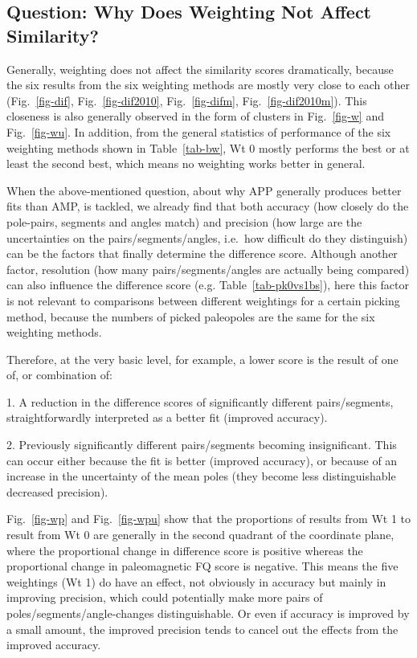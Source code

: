 \subsection{Question: Why Does Weighting Not Affect Similarity?}

Generally, weighting does not affect the similarity scores dramatically, because
the six results from the six weighting methods are mostly very close to each
other (Fig.~\ref{fig-dif}, Fig.~\ref{fig-dif2010}, Fig.~\ref{fig-difm},
Fig.~\ref{fig-dif2010m}). This closeness is also generally observed in the form
of clusters in Fig.~\ref{fig-w} and Fig.~\ref{fig-wu}. In addition, from the
general statistics of performance of the six weighting methods shown in
Table~\ref{tab-bw}, Wt 0 mostly performs the best or at least the second best,
which means no weighting works better in general.

When the above-mentioned question, about why APP generally produces better fits
than AMP, is tackled, we already find that both accuracy (how closely do the
pole-pairs, segments and angles match) and precision (how large are the
uncertainties on the pairs/segments/angles, i.e.\ how difficult do they
distinguish) can be the factors that finally determine the difference score.
Although another factor, resolution (how many pairs/segments/angles are actually
being compared) can also influence the difference score (e.g.
Table~\ref{tab-pk0vs1bs}), here this factor is not relevant to comparisons
between different weightings for a certain picking method, because the numbers
of picked paleopoles are the same for the six weighting methods.

Therefore, at the very basic level, for example, a lower score is the result of
one of, or combination of:

1. A reduction in the difference scores of significantly different
pairs/segments, straightforwardly interpreted as a better fit (improved
accuracy).

2. Previously significantly different pairs/segments becoming insignificant.
This can occur either because the fit is better (improved accuracy), or because
of an increase in the uncertainty of the mean poles (they become less
distinguishable \textemdash{} decreased precision).

Fig.~\ref{fig-wp} and Fig.~\ref{fig-wpu} show that the proportions of results
from Wt 1 to result from Wt 0 are generally in the second quadrant
of the coordinate plane, where the proportional change in difference score is
positive whereas the proportional change in paleomagnetic FQ score is negative.
This means the five weightings (Wt 1) do have an effect, not
obviously in accuracy but mainly in improving precision, which could potentially
make more pairs of poles/segments/angle-changes distinguishable. Or even if
accuracy is improved by a small amount, the improved precision tends to cancel
out the effects from the improved accuracy.

